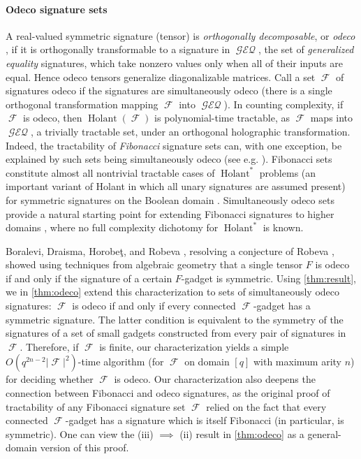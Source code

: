 \documentclass{theoretics}
\DeclareMathOperator{\fc}{\mathcal{F}}
\DeclareMathOperator{\holant}{Holant}
\DeclareMathOperator{\geneq}{\mathcal{GEQ}}
\begin{document}
\paragraph{Odeco signature sets}
A real-valued symmetric signature (tensor) is \emph{orthogonally decomposable}, 
or \emph{odeco} \cite{robeva}, if it is orthogonally transformable to a signature in $\geneq$, the set
of \emph{generalized equality} signatures, which take nonzero values only when all of their inputs
are equal. Hence odeco tensors generalize diagonalizable matrices.
Call a set $\fc$ of signatures odeco if the signatures are simultaneously odeco (there
is a single orthogonal transformation mapping $\fc$ into $\geneq$).
In counting complexity, if $\fc$ is odeco, then
$\holant(\fc)$ is polynomial-time tractable, as $\fc$ maps into $\geneq$, a trivially tractable set,
under an orthogonal holographic transformation.
Indeed, the tractability of \emph{Fibonacci} signature sets \cite{cai2008holographic}
can, with one exception, be explained by such 
sets being simultaneously odeco (see e.g. \cite[Section 2.2]{cai_chen_2017}). 
Fibonacci sets constitute almost all nontrivial tractable cases of $\holant^*$ problems
(an important variant of Holant in which all unary signatures are assumed 
present) for symmetric signatures on the Boolean domain \cite{cai_computational_2011}.
Simultaneously odeco
sets provide a natural starting point for extending Fibonacci signatures to higher
domains \cite{liu_2024,domain3}, where no full complexity dichotomy for $\holant^*$ is known.

Boralevi, Draisma, Horobeţ, and Robeva \cite{boralevi_orthogonal_2017}, resolving a conjecture of
Robeva \cite{robeva}, showed using techniques from algebraic geometry that a single tensor $F$ is 
odeco if and only if the signature of 
a certain $F$-gadget is symmetric. Using \autoref{thm:result}, we in \autoref{thm:odeco} extend this 
characterization to sets of simultaneously odeco signatures: $\fc$ is odeco if and only if every connected 
$\fc$-gadget has a symmetric signature. The latter condition is 
equivalent to the symmetry of the signatures of a set of small gadgets constructed from 
every pair of 
signatures in $\fc$. Therefore, if $\fc$ is finite, our characterization yields a simple
$O(q^{2n-2} |\fc|^2)$-time algorithm (for $\fc$ on domain $[q]$ with maximum arity $n$) for deciding
whether $\fc$ is odeco.
Our characterization also deepens the connection between Fibonacci and odeco 
signatures, as the original proof of tractability of any Fibonacci signature set $\fc$
\cite{cai2008holographic} relied on the fact that every connected $\fc$-gadget has a signature which is
itself Fibonacci (in particular, is symmetric). 
One can view the (iii) $\implies$ (ii) result in \autoref{thm:odeco} as a general-domain version
of this proof.
\end{document}
